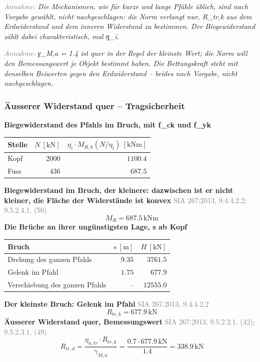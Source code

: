 \documentclass[11pt,a4paper]{article}
\newcommand{\normref}[1]{{\small\textcolor{gray}{#1}}}
\newcommand{\hinweis}[2]{\par\noindent\textcolor{gray}{\textit{#1:}} \textit{#2}\par}
\begin{document}
\hinweis{Annahme}{Die Mechanismen, wie für kurze und lange Pfähle üblich, sind nach Vorgabe gewählt, nicht nachgeschlagen: die Norm verlangt nur, R\_tr,k aus dem Erdwiderstand und dem inneren Widerstand zu bestimmen. Der Biegewiderstand zählt dabei charakteristisch, mal η\_i.}
\hinweis{Annahme}{γ\_M,a = 1.4 ist quer in der Regel der kleinste Wert; die Norm will den Bemessungswert je Objekt bestimmt haben. Die Bettungskraft steht mit denselben Beiwerten gegen den Erdwiderstand – beides nach Vorgabe, nicht nachgeschlagen.}
\subsubsection{Äusserer Widerstand quer – Tragsicherheit}
\noindent\textbf{Biegewiderstand des Pfahls im Bruch, mit f\_ck und f\_yk}
\begin{longtable}{lrr}
\hline
Stelle & $N\ [\mathrm{kN}]$ & $\eta_i \cdot M_{R,k}(N / \eta_i)\ [\mathrm{kNm}]$ \\
\hline
\endhead
Kopf & $2000$ & $1100.4$ \\
Fuss & $436$ & $687.5$ \\
\hline
\end{longtable}
\noindent\textbf{Biegewiderstand im Bruch, der kleinere: dazwischen ist er nicht kleiner, die Fläche der Widerstände ist konvex} \hfill \normref{SIA 267:2013, 9.4.4.2.2; 9.5.2.4.1, (50)}
\begin{equation*}
M_R = 687.5\,\mathrm{kNm}
\end{equation*}
\noindent\textbf{Die Brüche an ihrer ungünstigsten Lage, s ab Kopf}
\begin{longtable}{lrr}
\hline
Bruch & $s\ [\mathrm{m}]$ & $H\ [\mathrm{kN}]$ \\
\hline
\endhead
Drehung des ganzen Pfahls & $9.35$ & $3761.5$ \\
Gelenk im Pfahl & $1.75$ & $677.9$ \\
Verschiebung des ganzen Pfahls & – & $12555.0$ \\
\hline
\end{longtable}
\noindent\textbf{Der kleinste Bruch: Gelenk im Pfahl} \hfill \normref{SIA 267:2013, 9.4.4.2.2}
\begin{equation*}
R_{tr,k} = 677.9\,\mathrm{kN}
\end{equation*}
\noindent\textbf{Äusserer Widerstand quer, Bemessungswert} \hfill \normref{SIA 267:2013, 9.5.2.2.1, (42); 9.5.2.3.1, (49)}
\begin{equation*}
R_{tr,d} = \frac{\eta_{a,tr} \cdot R_{tr,k}}{\gamma_{M,a}} = \frac{0.7 \cdot 677.9\,\mathrm{kN}}{1.4} = 338.9\,\mathrm{kN}
\end{equation*}
\end{document}
